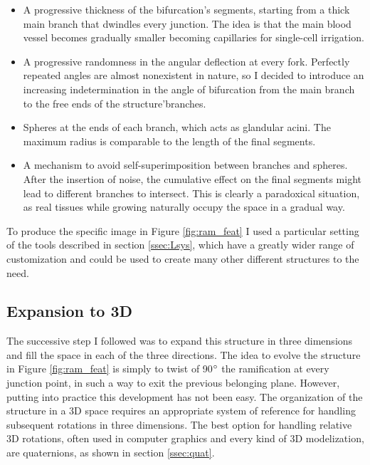     \begin{itemize}
        \item A progressive thickness of the bifurcation's segments, starting from a thick main branch that dwindles every junction. The idea is that the main blood vessel becomes gradually smaller becoming capillaries for single-cell irrigation.
        \item A progressive randomness in the angular deflection at every fork. Perfectly repeated angles are almost nonexistent in nature, so I decided to introduce an increasing indetermination in the angle of bifurcation from the main branch to the free ends of the structure'branches.
        \item Spheres at the ends of each branch, which acts as glandular acini. The maximum radius is comparable to the length of the final segments.
        \item A mechanism to avoid self-superimposition between branches and spheres. After the insertion of noise, the cumulative effect on the final segments might lead to different branches to intersect. This is clearly a paradoxical situation, as real tissues while growing naturally occupy the space in a gradual way.
    \end{itemize}

    To produce the specific image in Figure \ref{fig:ram_feat} I used a particular setting of the tools described in section \ref{ssec:Lsys}, which have a greatly wider range of customization and could be used to create many other different structures to the need.

\subsection{Expansion to 3D}
    The successive step I followed was to expand this structure in three dimensions and fill the space in each of the three directions. The idea to evolve the structure in Figure \ref{fig:ram_feat} is simply to twist of 90$\degree$ the ramification at every junction point, in such a way to exit the previous belonging plane. However, putting into practice this development has not been easy. The organization of the structure in a 3D space requires an appropriate system of reference for handling subsequent rotations in three dimensions. The best option for handling relative 3D rotations, often used in computer graphics and every kind of 3D modelization, are quaternions, as shown in section \ref{ssec:quat}.

